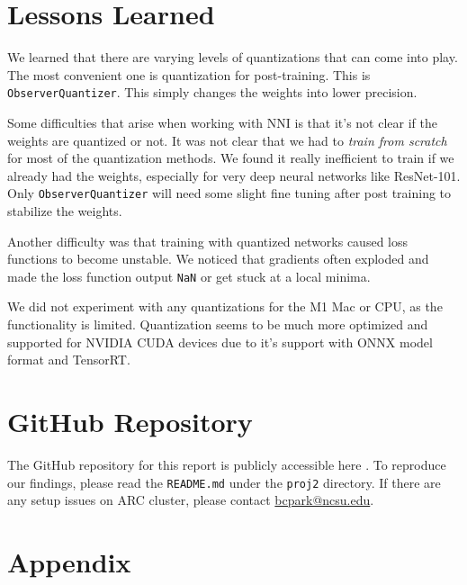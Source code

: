 \documentclass{article}
\begin{document}
\section{Lessons Learned}
We learned that there are varying levels of quantizations that can come into play. The most convenient one is quantization for post-training. This is \verb|ObserverQuantizer|. This simply changes the weights into lower precision.


Some difficulties that arise when working with NNI is that it's not clear if the weights are quantized or not. It was not clear that we had to \textit{train from scratch} for most of the quantization methods. We found it really inefficient to train if we already had the weights, especially for very deep neural networks like ResNet-101. Only \verb|ObserverQuantizer| will need some slight fine tuning after post training to stabilize the weights. 

Another difficulty was that training with quantized networks caused loss functions to become unstable. We noticed that gradients often exploded and made the loss function output \verb|NaN| or get stuck at a local minima.

We did not experiment with any quantizations for the M1 Mac or CPU, as the functionality is limited. Quantization seems to be much more optimized and supported for NVIDIA CUDA devices due to it's support with ONNX model format and TensorRT. 

\section{GitHub Repository}
The GitHub repository for this report is publicly accessible here \cite{proj2-repo}. To reproduce our findings, please read the \verb|README.md| under the \verb|proj2| directory. If there are any setup issues on ARC cluster, please contact \href{mailto:bcpark@ncsu.edu}{bcpark@ncsu.edu}.





\section{Appendix}
\end{document}

